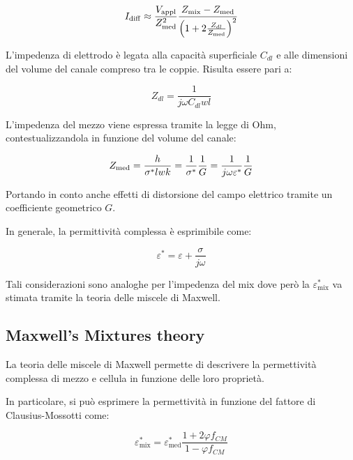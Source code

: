 \begin{equation}
	I_{\operatorname{d i f f}}\approx {V_{\operatorname{a p p l}}\over Z_{\operatorname{m e d}}^2} \frac{Z_{\operatorname{m i x}} -Z_{\operatorname{m e d}}}{\left(1+ 2{Z_{dl}\over Z_{\operatorname{m e d}} }\right)^2}
	\label{eq:idiff}
\end{equation}

L'impedenza di elettrodo è legata alla capacità superficiale $C_{dl}$ e alle dimensioni del volume del canale compreso tra le coppie. Risulta essere pari a:

\begin{equation}
	Z_{d l}=\frac{1}{j \omega C_{d l} w l}
\end{equation}

L'impedenza del mezzo viene espressa tramite la legge di Ohm, contestualizzandola in funzione del volume del canale:

\begin{equation}
	Z_{\operatorname{m e d}}=\frac{h}{\sigma^{*} l w k}={1\over \sigma^*}{1\over G}={1\over j\omega \varepsilon ^*}{1\over G}
\end{equation}

Portando in conto anche effetti di distorsione del campo elettrico tramite un coefficiente geometrico $G$. 

In generale, la permittività complessa è esprimibile come:

\begin{equation}
	\varepsilon^{*}=\varepsilon+\frac{\sigma}{j \omega}
\end{equation}

Tali considerazioni sono analoghe per l'impedenza del mix dove però la $\varepsilon^*_{\operatorname{m i x}}$ va stimata tramite la teoria delle miscele di Maxwell. 

\subsection{Maxwell's Mixtures theory}

La teoria delle miscele di Maxwell permette di descrivere la permettività complessa di mezzo e cellula in funzione delle loro proprietà.

In particolare, si può esprimere la permettività in funzione del fattore di Clausius-Mossotti come:

\begin{equation}
	\varepsilon_{\operatorname{mix}}^{*}=\varepsilon_{\operatorname{m e d}}^{*} \frac{1+2 \varphi f_{C M}}{1-\varphi f_{C M}}
\end{equation}

